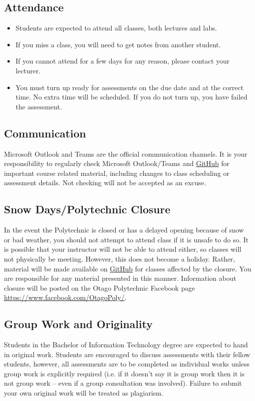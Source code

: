 \documentclass{article}
\begin{document}
\subsection*{Attendance}
\begin{itemize}
  \item Students are expected to attend all classes, both lectures and labs.
  \item If you miss a class, you will need to get notes from another student.
  \item If you cannot attend for a few days for any reason, please contact your lecturer.
  \item You must turn up ready for assessments on the due date and at the correct time. No extra time will be scheduled. If you do not turn up, you have failed the assessment.
\end{itemize}

\subsection*{Communication}
Microsoft Outlook and Teams are the official communication channels. It is your responsibility to regularly check Microsoft Outlook/Teams and \href{https://github.com/Grayson-Orr/Course-Files}{GitHub} for important course related material, including changes to class scheduling or assessment details. Not checking will not be accepted as an excuse.

\subsection*{Snow Days/Polytechnic Closure}
In the event the Polytechnic is closed or has a delayed opening because of snow or bad weather, you should not attempt to attend class if it is unsafe to do so. It is possible that your instructor will not be able to attend either, so classes will not physically be meeting. However, this does not become a holiday. Rather, material will be made available on \href{https://github.com/Grayson-Orr/Course-Files}{GitHub} for classes affected by the closure. You are responsible for any material presented in this manner. Information about closure will be posted on the Otago Polytechnic Facebook page \href{https://www.facebook.com/OtagoPoly/}{https://www.facebook.com/OtagoPoly/}.

\subsection*{Group Work and Originality}
Students in the Bachelor of Information Technology degree are expected to hand in original work. Students are encouraged to discuss assessments with their fellow students, however, all assessments are to be completed as individual works unless group work is explicitly required (i.e. if it doesn’t say it is group work then it is not group work – even if a group consultation was involved). Failure to submit your own original work will be treated as plagiarism.
\end{document}
